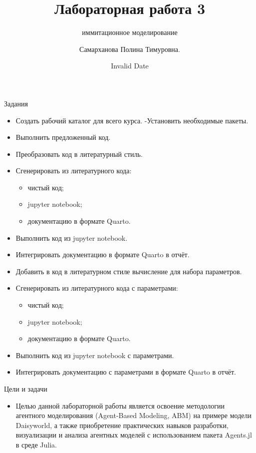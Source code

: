 \documentclass[
  ignorenonframetext,
  aspectratio=169,
  russian,
]{beamer}
\title{Лабораторная работа 3}
\subtitle{иммитационное моделирование}
\author{Самарханова Полина Тимуровна.}
\date{Invalid Date}
\institute{Российский университет дружбы народов, Москва, Россия}
\providecommand{\tightlist}{%
  \setlength{\itemsep}{0pt}\setlength{\parskip}{0pt}}
\begin{document}
\frame{\titlepage}


\begin{frame}{Задания}
\label{ux437ux430ux434ux430ux43dux438ux44f}
\begin{itemize}[<+->]
\tightlist
\item
  Создать рабочий каталог для всего курса. -Установить необходимые
  пакеты.
\item
  Выполнить предложенный код.
\item
  Преобразовать код в литературный стиль.
\item
  Сгенерировать из литературного кода:

  \begin{itemize}[<+->]
  \tightlist
  \item
    чистый код;
  \item
    jupyter notebook;
  \item
    документацию в формате Quarto.
  \end{itemize}
\item
  Выполнить код из jupyter notebook.
\item
  Интегрировать документацию в формате Quarto в отчёт.
\item
  Добавить в код в литературном стиле вычисление для набора параметров.
\item
  Сгенерировать из литературного кода с параметрами:

  \begin{itemize}[<+->]
  \tightlist
  \item
    чистый код;
  \item
    jupyter notebook;
  \item
    документацию в формате Quarto.
  \end{itemize}
\item
  Выполнить код из jupyter notebook с параметрами.
\item
  Интегрировать документацию с параметрами в формате Quarto в отчёт.
\end{itemize}
\end{frame}

\begin{frame}{Цели и задачи}
\label{ux446ux435ux43bux438-ux438-ux437ux430ux434ux430ux447ux438}
\begin{itemize}[<+->]
\tightlist
\item
  Целью данной лабораторной работы является освоение методологии
  агентного моделирования (Agent-Based Modeling, ABM) на примере модели
  Daisyworld, а также приобретение практических навыков разработки,
  визуализации и анализа агентных моделей с использованием пакета
  Agents.jl в среде Julia.
\end{itemize}
\end{frame}
\end{document}
